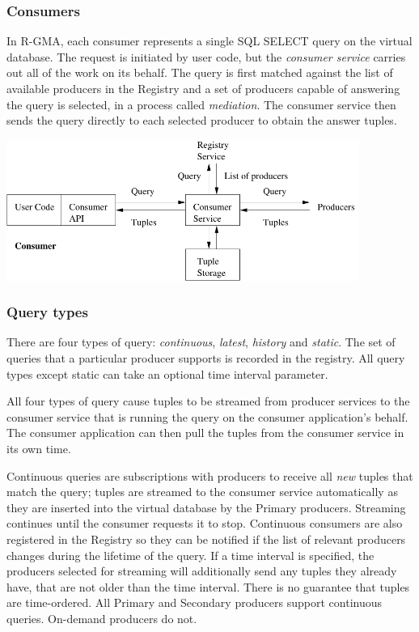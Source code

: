 \subsubsection{Consumers}

In R-GMA, each consumer represents a single SQL SELECT
query on the virtual database. The request is initiated by user code,
but the \textit{consumer service} carries out all of the work on its
behalf. The query is first matched against the list of available
producers in the Registry and a set of producers capable of answering
the query is selected, in a process called \textit{mediation}. The
consumer service then sends the query directly to each selected
producer to obtain the answer tuples.

\begin{center}
\includegraphics[width=115mm]{consumer_overview}
\end{center}

\subsubsection{Query types}\label{sec:BackgroundQueryTypes}

There are four types of query: \textit{continuous},
\textit{latest}, \textit{history} and
\textit{static}. The set of queries that a particular producer supports is
recorded in the registry. All query types except static can take an
optional time interval parameter.

All four types of query cause tuples to be streamed
from producer services to the consumer service that is running the
query on the consumer application's behalf. The consumer application
can then pull the tuples from the consumer service in its own time.

Continuous queries are subscriptions with
producers to receive all \textit{new} tuples that match the query;
tuples are streamed to the consumer service automatically as they are
inserted into the virtual database by the Primary producers.
Streaming continues until the consumer requests it to stop.
Continuous consumers are also registered in the Registry so they can
be notified if the list of relevant producers changes during the
lifetime of the query. If a time interval is specified, the producers
selected for streaming will additionally send any tuples they already
have, that are not older than the time interval.
There is no guarantee that tuples are time-ordered.
All Primary and Secondary producers support continuous queries.
On-demand producers do not.

